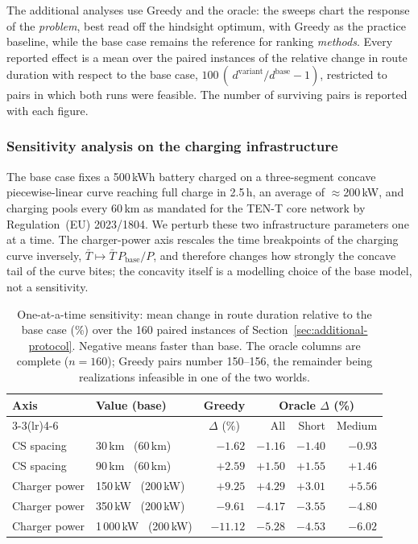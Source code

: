 The additional analyses use Greedy and the oracle: the sweeps chart the response
of the \emph{problem}, best read off the hindsight optimum, with Greedy as the
practice baseline, while the base case remains the reference for ranking
\emph{methods}.  Every reported effect is a mean over the paired instances of
the relative change in route duration with respect to the base case,
$100\,(\,d^{\text{variant}}/d^{\text{base}} - 1)$, restricted to pairs in which
both runs were feasible.  The number of surviving pairs is reported with each
figure.


\subsubsection{Sensitivity analysis on the charging infrastructure}
\label{sec:sensitivity}

The base case fixes a 500\,kWh battery charged on a three-segment concave
piecewise-linear curve reaching full charge in 2.5\,h, an average of
$\approx$200\,kW, and charging pools every 60\,km as mandated for the TEN-T core
network by Regulation~(EU) 2023/1804.  We perturb these two infrastructure
parameters one at a time.  The charger-power axis rescales the time breakpoints
of the charging curve inversely,
$\bar{T} \mapsto \bar{T}\,P_{\mathrm{base}}/P$, and therefore changes how
strongly the concave tail of the curve bites; the concavity itself is a
modelling choice of the base model, not a sensitivity.

\begin{table}[htbp]
\centering
\caption{One-at-a-time sensitivity: mean change in route duration relative to
the base case (\%) over the 160 paired instances of
Section~\ref{sec:additional-protocol}.  Negative means faster than base.  The
oracle columns are complete ($n = 160$); Greedy pairs number 150--156, the
remainder being realizations infeasible in one of the two worlds.}
\label{tab:sensitivity}
\begin{tabular}{llrrrr}
\toprule
\multirow{2}{*}{\textbf{Axis}} & \multirow{2}{*}{\textbf{Value (base)}}
 & \multicolumn{1}{c}{\textbf{Greedy}} & \multicolumn{3}{c}{\textbf{Oracle $\Delta$ (\%)}} \\
\cmidrule(lr){3-3}\cmidrule(lr){4-6}
 & & \multicolumn{1}{c}{$\Delta$ (\%)} & All & Short & Medium \\
\midrule
CS spacing    & 30\,km \ (60\,km)     & $-1.62$  & $-1.16$ & $-1.40$ & $-0.93$ \\
CS spacing    & 90\,km \ (60\,km)     & $+2.59$  & $+1.50$ & $+1.55$ & $+1.46$ \\
\midrule
Charger power & 150\,kW \ (200\,kW)   & $+9.25$  & $+4.29$ & $+3.01$ & $+5.56$ \\
Charger power & 350\,kW \ (200\,kW)   & $-9.61$  & $-4.17$ & $-3.55$ & $-4.80$ \\
Charger power & 1\,000\,kW \ (200\,kW)& $-11.12$ & $-5.28$ & $-4.53$ & $-6.02$ \\
\bottomrule
\end{tabular}
\end{table}

